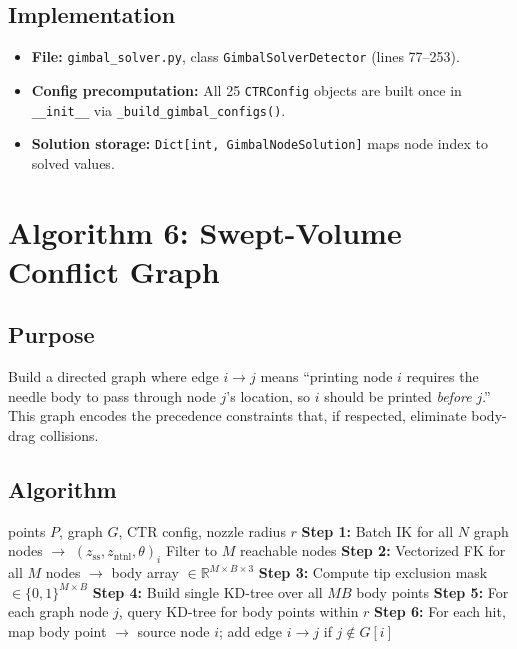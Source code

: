 \documentclass[11pt,a4paper]{article}
\newcommand{\Oh}[1]{$O(#1)$}
\newcommand{\filename}[1]{\texttt{\textcolor{accentblue}{#1}}}
\newcommand{\funcname}[1]{\texttt{\textcolor{codepurple}{#1}}}
\begin{document}
\subsection{Implementation}

\begin{itemize}[nosep]
    \item \textbf{File:} \filename{gimbal\_solver.py}, class \texttt{GimbalSolverDetector} (lines 77--253).
    \item \textbf{Config precomputation:} All 25 \texttt{CTRConfig} objects are built once in \texttt{\_\_init\_\_} via \funcname{\_build\_gimbal\_configs()}.
    \item \textbf{Solution storage:} \texttt{Dict[int, GimbalNodeSolution]} maps node index to solved values.
\end{itemize}


\section{Algorithm 6: Swept-Volume Conflict Graph}
\label{sec:conflict}

\subsection{Purpose}

Build a directed graph where edge $i \to j$ means ``printing node $i$ requires the needle body to pass through node $j$'s location, so $i$ should be printed \emph{before} $j$.'' This graph encodes the precedence constraints that, if respected, eliminate body-drag collisions.

\subsection{Algorithm}

\begin{algorithm}[H]
\caption{Conflict Graph Construction}
\begin{algorithmic}[1]
\Require points $P$, graph $G$, CTR config, nozzle radius $r$
\State \textbf{Step 1:} Batch IK for all $N$ graph nodes $\to$ $(z_\text{ss}, z_\text{ntnl}, \theta)_i$ \Comment{\Oh{N}}
\State Filter to $M$ reachable nodes
\State \textbf{Step 2:} Vectorized FK for all $M$ nodes $\to$ body array $\in \mathbb{R}^{M \times B \times 3}$ \Comment{\Oh{MB}}
\State \textbf{Step 3:} Compute tip exclusion mask $\in \{0,1\}^{M \times B}$ \Comment{\Oh{MB}}
\State \textbf{Step 4:} Build single KD-tree over all $MB$ body points \Comment{\Oh{MB \log(MB)}}
\State \textbf{Step 5:} For each graph node $j$, query KD-tree for body points within $r$ \Comment{\Oh{N \log(MB)}}
\State \textbf{Step 6:} For each hit, map body point $\to$ source node $i$; add edge $i \to j$ if $j \notin G[i]$ \Comment{\Oh{E}}
\end{algorithmic}
\end{algorithm}
\end{document}
